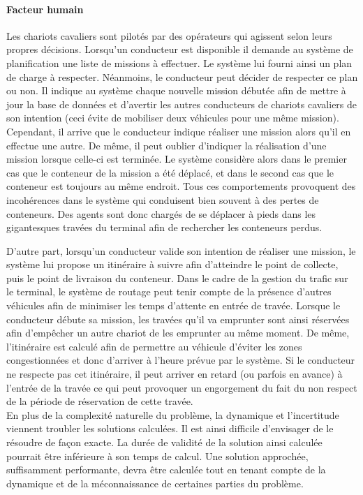 \paragraph{Facteur humain}
Les chariots cavaliers sont pilotés par des opérateurs qui agissent selon leurs propres décisions. 
Lorsqu'un conducteur est disponible il demande au système de planification une liste de missions à effectuer. 
Le système lui fourni ainsi un plan de charge à respecter. 
Néanmoins, le conducteur peut décider de respecter ce plan ou non. 
Il indique au système chaque nouvelle mission débutée afin de mettre à jour la base de données et d'avertir les autres conducteurs de chariots cavaliers de son intention (ceci évite de mobiliser deux véhicules pour une même mission). 
Cependant, il arrive que le conducteur indique réaliser une mission alors qu'il en effectue une autre. 
De même, il peut oublier d'indiquer la réalisation d'une mission lorsque celle-ci est terminée. 
Le système considère alors dans le premier cas que le conteneur de la mission a été déplacé, et dans le second cas que le conteneur est toujours au même endroit. 
Tous ces comportements provoquent des incohérences dans le système qui conduisent bien souvent à des pertes de conteneurs. 
Des agents sont donc chargés de se déplacer à pieds dans les gigantesques travées du terminal afin de rechercher les conteneurs perdus.

D'autre part, lorsqu'un conducteur valide son intention de réaliser une mission, le système lui propose un itinéraire à suivre afin d'atteindre le point de collecte, puis le point de livraison du conteneur. 
Dans le cadre de la gestion du trafic sur le terminal, le système de routage peut tenir compte de la présence d'autres véhicules afin de minimiser les temps d'attente en entrée de travée. 
Lorsque le conducteur débute sa mission, les travées qu'il va emprunter sont ainsi réservées afin d'empêcher un autre chariot de les emprunter au même moment. 
De même, l'itinéraire est calculé afin de permettre au véhicule d'éviter les zones congestionnées et donc d'arriver à l'heure prévue par le système. 
Si le conducteur ne respecte pas cet itinéraire, il peut arriver en retard (ou parfois en avance) à l'entrée de la travée ce qui peut provoquer un engorgement du fait du non respect de la période de réservation de cette travée.\\

En plus de la complexité naturelle du problème, la dynamique et l'incertitude viennent troubler les solutions calculées. Il est ainsi difficile d'envisager de le résoudre de façon exacte. La durée de validité de la solution ainsi calculée pourrait être inférieure à son temps de calcul. Une solution approchée, suffisamment performante, devra être calculée tout en tenant compte de la dynamique et de la méconnaissance de certaines parties du problème.


